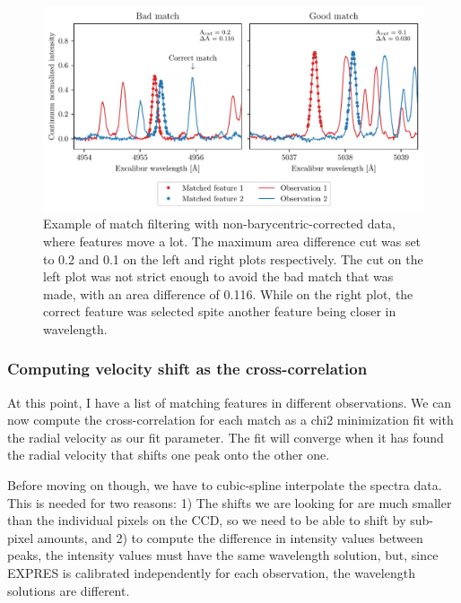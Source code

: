     \begin{figure}%
        \begin{wide}  
            \includegraphics[width=\textwidth]{figures/good_match_bad_match.pdf}
            \caption{Example of match filtering with non-barycentric-corrected data, where features move a lot. The maximum area difference cut was set to 0.2 and 0.1 on the left and right plots respectively. The cut on the left plot was not strict enough to avoid the bad match that was made, with an area difference of 0.116. While on the right plot, the correct feature was selected spite another feature being closer in wavelength.}
            \label{fig:good_match_bad_match}
        \end{wide}
    \end{figure}

    \subsubsection{Computing velocity shift as the cross-correlation}

    At this point, I have a list of matching features in different observations. We can now compute the cross-correlation for each match as a chi2 minimization fit with the radial velocity as our fit parameter. The fit will converge when it has found the radial velocity that shifts one peak onto the other one.
    
    Before moving on though, we have to cubic-spline interpolate the spectra data. This is needed for two reasons: 1) The shifts we are looking for are much smaller than the individual pixels on the CCD, so we need to be able to shift by sub-pixel amounts, and 2) to compute the difference in intensity values between peaks, the intensity values must have the same wavelength solution, but, since EXPRES is calibrated independently for each observation, the wavelength solutions are different.
    
